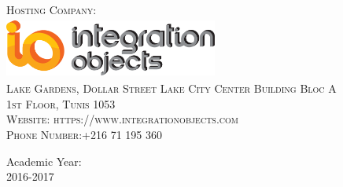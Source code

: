 \begin{titlepage}
\begin{center}
~\\
~\\
~\\
~\\

\textsc{\LARGE Hosting Company: }\\[0.3cm]
\includegraphics[width=7cm,height=2cm]{./iologo}~\\[0.4cm]
\textsc{Lake Gardens, Dollar Street Lake City Center Building Bloc A\\ 1st Floor, Tunis 1053 \\ Website: https://www.integrationobjects.com \\ Phone Number:+216 71 195 360}\\[1cm]


\vfill

{\large Academic Year:}\\
{\large 2016-2017}

\end{center}
\end{titlepage}